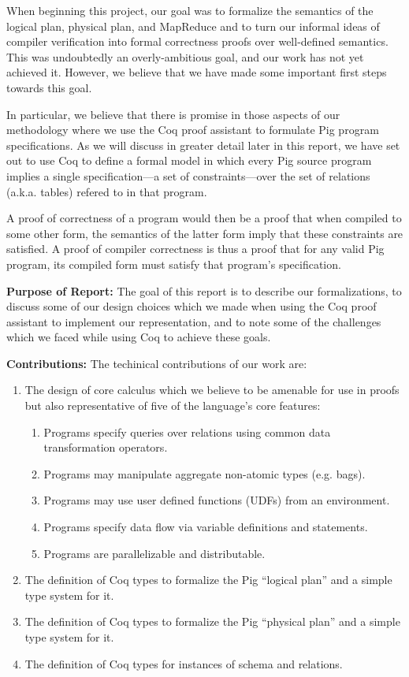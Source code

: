 When beginning this project, our goal was to formalize the semantics of the logical plan, physical plan, and MapReduce and to turn our informal ideas of compiler verification into formal correctness proofs over well-defined semantics. This was undoubtedly an overly-ambitious goal, and our work has not yet achieved it. However, we believe that we have made some important first steps towards this goal.

In particular, we believe that there is promise in those aspects of our methodology where we use the Coq proof assistant to formulate Pig program specifications. As we will discuss in greater detail later in this report, we have set out to use Coq to define a formal model in which every Pig source program implies a single specification---a set of constraints---over the set of relations (a.k.a. tables) refered to in that program.

A proof of correctness of a program would then be a proof that when compiled to some other form, the semantics of the latter form imply that these constraints are satisfied. A proof of compiler correctness is thus a proof that for any valid Pig program, its compiled form must satisfy that program's specification.

\textbf{Purpose of Report:} The goal of this report is to describe our formalizations, to discuss some of our design choices which we made when using the Coq proof assistant to implement our representation, and to note some of the challenges which we faced while using Coq to achieve these goals.

\textbf{Contributions:} The techinical contributions of our work are:

\begin{enumerate}
  \item The design of core calculus which we believe to be amenable for use
	      in proofs but also representative of five of the language's core features:
	\begin{enumerate}
		\item Programs specify queries over relations using common data
		      transformation operators.
		\item Programs may manipulate aggregate non-atomic types (e.g. bags).
		\item Programs may use user defined functions (UDFs) from an environment.
		\item Programs specify data flow via variable definitions and statements.
		\item Programs are parallelizable and distributable.
	\end{enumerate}
  \item The definition of Coq types to formalize the Pig ``logical plan'' and
	      a simple type system for it.
  \item The definition of Coq types to formalize the Pig ``physical plan''
	      and a simple type system for it.
  \item The definition of Coq types for instances of schema and relations.
\end{enumerate}

